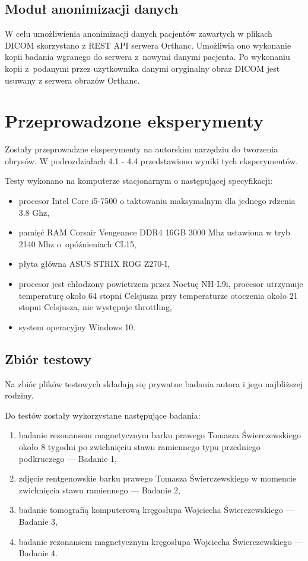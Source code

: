 \documentclass[a4paper,11pt,twoside,openright]{report}
\newcommand\blankpage{%
    \null
    \thispagestyle{empty}%
    \newpage}
\theoremstyle{definition}
\begin{document}
\section {Moduł anonimizacji danych}

W celu umożliwienia anonimizacji danych pacjentów zawartych w plikach DICOM skorzystano
z REST API serwera Orthanc. Umożliwia ono wykonanie kopii badania wgranego do serwera
z~nowymi danymi pacjenta. Po wykonaniu kopii z~podanymi przez użytkownika danymi
oryginalny obraz DICOM jest usuwany z serwera obrazów Orthanc.


\afterpage{\blankpage}

\chapter {Przeprowadzone eksperymenty}

Zostały przeprowadzne eksperymenty na autorskim narzędziu do tworzenia obrysów.
W podrozdziałach 4.1 - 4.4 przedstawiono wyniki tych eksperymentów.

Testy wykonano na komputerze stacjonarnym o następującej specyfikacji:
\begin{itemize}[noitemsep]
\item procesor Intel Core i5-7500 o taktowaniu maksymalnym dla jednego rdzenia 3.8 Ghz,
\item pamięć RAM Corsair Vengeance DDR4 16GB 3000 Mhz ustawiona w tryb 2140 Mhz o~opóźnieniach CL15,
\item płyta główna ASUS STRIX ROG Z270-I,
\item procesor jest chłodzony powietrzem przez Noctuę NH-L9i, procesor utrzymuje
temperaturę około 64 stopni Celsjusza przy temperaturze otoczenia około 21 stopni
Celsjusza, nie występuje throttling,
\item system operacyjny Windows 10.
\end{itemize}

\section {Zbiór testowy}

Na zbiór plików testowych składają się prywatne badania autora i jego najbliższej rodziny.

Do testów zostały wykorzystane następujące badania:
\begin{enumerate}[noitemsep]
\item badanie rezonansem magnetycznym barku prawego Tomasza Świerczewskiego około
8 tygodni po zwichnięciu stawu ramiennego typu przedniego podkruczego --- Badanie 1,
\item zdjęcie rentgenowskie barku prawego Tomasza Świerczewskiego w momencie zwichnięcia stawu ramiennego --- Badanie 2,
\item badanie tomografią komputerową kręgosłupa Wojciecha Świerczewskiego --- Badanie 3,
\item badanie rezonansem magnetycznym kręgosłupa Wojciecha Świerczewskiego --- Badanie 4.
\end{enumerate}
\end{document}
